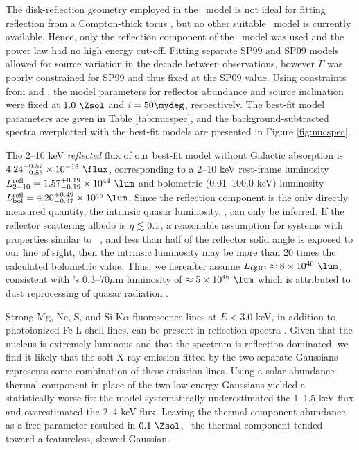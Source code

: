 \documentclass[useAMS,usenatbib]{mn2e}
\begin{document}
The disk-reflection geometry employed in the \pexrav\ model is not
ideal for fitting reflection from a Compton-thick torus
\citep{2009MNRAS.397.1549M}, but no other suitable \xspec\ model is
currently available. Hence, only the reflection component of the
\pexrav\ model was used and the power law had no high energy
cut-off. Fitting separate SP99 and SP09 models allowed for source
variation in the decade between observations, however $\Gamma$ was
poorly constrained for SP99 and thus fixed at the SP09 value. Using
constraints from \citet{1997A&A...318L...1T} and
\citet{2000AJ....120..562T}, the model parameters for reflector
abundance and source inclination were fixed at $1.0 ~\Zsol$ and $i =
50\mydeg$, respectively. The best-fit model parameters are given in
Table \ref{tab:nucspec}, and the background-subtracted spectra
overplotted with the best-fit models are presented in Figure
\ref{fig:nucspec}.

The 2--10 keV {\it{reflected}} flux of our best-fit model without
Galactic absorption is $4.24^{+0.57}_{-0.55} \times 10^{-13} ~\flux$,
corresponding to a 2--10 keV rest-frame luminosity
$L^{\rm{refl}}_{2-10} = 1.57^{+0.19}_{-0.19} \times 10^{44} ~\lum$ and
bolometric (0.01--100.0 keV) luminosity $L_{\rm{bol}}^{\rm{refl}} =
4.20^{+0.49}_{-0.47} \times 10^{45} ~\lum$. Since the reflection
component is the only directly measured quantity, the intrinsic quasar
luminosity, \lqso, can only be inferred. If the reflector scattering
albedo is $\eta \lesssim 0.1$, a reasonable assumption for systems with
properties similar to \irs\ \citep{2009MNRAS.397.1549M}, and less than
half of the reflector solid angle is exposed to our line of sight,
then the intrinsic luminosity may be more than 20 times the calculated
bolometric value. Thus, we hereafter assume $\lqso \approx 8 \times
10^{46} ~\lum$, consistent with \irs's 0.3--70$\mu$m luminosity of
$\approx 5 \times 10^{46} ~\lum$ which is attributed to dust
reprocessing of quasar radiation \citep[][H99]{1988ApJ...328..161K}.

Strong Mg, Ne, S, and Si K$\alpha$ fluorescence lines at $E < 3.0$
keV, in addition to photoionized Fe L-shell lines, can be present in
reflection spectra \citep{1990ApJ...362...90B,
  1991MNRAS.249..352G}. Given that the nucleus is extremely luminous
and that the spectrum is reflection-dominated, we find it likely that
the soft X-ray emission fitted by the two separate Gaussians
represents some combination of these emission lines. Using a solar
abundance thermal component in place of the two low-energy Gaussians
yielded a statistically worse fit: the model systematically
underestimated the 1--1.5 keV flux and overestimated the 2--4 keV
flux. Leaving the thermal component abundance as a free parameter
resulted in $0.1 ~\Zsol$, \ie\ the thermal component tended toward a
featureless, skewed-Gaussian.
\end{document}
